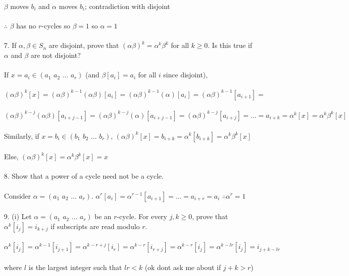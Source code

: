 \documentclass{article}
\begin{document}
\begin{siderules}
\null\qquad \(\beta\) moves \(b_i\) and \(\alpha\) moves \(b_i\); contradiction with disjoint\\\\
\null\qquad\(\therefore\) \(\beta\) has no \(r\)-cycles so \(\beta=1\) so \(\alpha=1\)\\\\
\color{blue}7. If \(\alpha,\beta\in S_n\) are disjoint, prove that \((\alpha\beta)^k=\alpha^k\beta^k\) for all \(k\ge 0\). Is this true if \(\alpha\) and \(\beta\) are not disjoint?\color{black}\\\\
\null\qquad If \(x=a_i\in(a_1\,\,a_2\,\,...\,\,a_r)\) (and \(\beta[a_i]=a_i\) for all \(i\) since disjoint),\\\\ \null\qquad\((\alpha\beta)^k[x]=(\alpha\beta)^{k-1}(\alpha\beta)[a_i]=(\alpha\beta)^{k-1}(\alpha)[a_i]=(\alpha\beta)^{k-1}[a_{i+1}]=\)\\\\
\null\qquad\((\alpha\beta)^{k-j}(\alpha\beta)[a_{i+j-1}]=(\alpha\beta)^{k-j}(\alpha)[a_{i+j-1}]=(\alpha\beta)^{k-j}[a_{i+j}]=...=a_{i+k}=\alpha^k[x]=\alpha^k\beta^k[x]\)\\\\
\null\qquad Similarly, if \(x=b_i\in(b_1\,\,b_2\,\,...\,\,b_r)\), \((\alpha\beta)^k[x]=b_{i+k}=\alpha^k[b_{i+k}]=\alpha^k\beta^k[x]\)\\\\
\null\qquad Else, \((\alpha\beta)^k[x]=\alpha^k\beta^k[x]=x\)\\\\
\color{blue}8. Show that a power of a cycle need not be a cycle.\color{black}\\\\
\null\qquad Consider \(\alpha=(a_1\,\,a_2\,\,...\,\,a_r)\). \(\alpha^r[a_i]=\alpha^{r-1}[a_{i+1}]=...=a_{i+r}=a_i\) \(\therefore \alpha^r=1\)\\\\
\color{blue}9. (i) Let \(\alpha=(a_1\,\,a_2\,\,...\,\,a_r)\) be an \(r\)-cycle. For every \(j,k\ge 0\), prove that \(\alpha^k[i_j]=i_{k+j}\) if subscripts are read modulo \(r\).\color{black}\\\\
\null\qquad \(\alpha^k[i_j]=\alpha^{k-1}[i_{j+1}]=\alpha^{k-r+j}[i_r]=\alpha^{k-r}[i_{r+j}]=\alpha^{k-r}[i_j]=\alpha^{k-lr}[i_j]=i_{j+k-lr}\)\\\\
\null\qquad where \(l\) is the largest integer such that \(lr<k\) (ok dont ask me about if \(j+k>r\))\\\\

\end{siderules}
\end{document}
